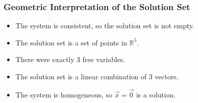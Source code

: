 \begin{frame}
\frametitle{Geometric Interpretation of the Solution Set}
\begin{itemize}
    \item<1-> The system is consistent, so the solution set is not empty. 
    \item<2-> The solution set is a set of points in $\mathbb R^5$. 
    \item<3-> There were exactly 3 free variables. 
    \item<4-> The solution set is a linear combination of 3 vectors.
    \item<5-> The system is homogeneous, so $\vec x = \vec 0$ is a solution. 
\end{itemize}

\vspace{12pt}


\end{frame}



